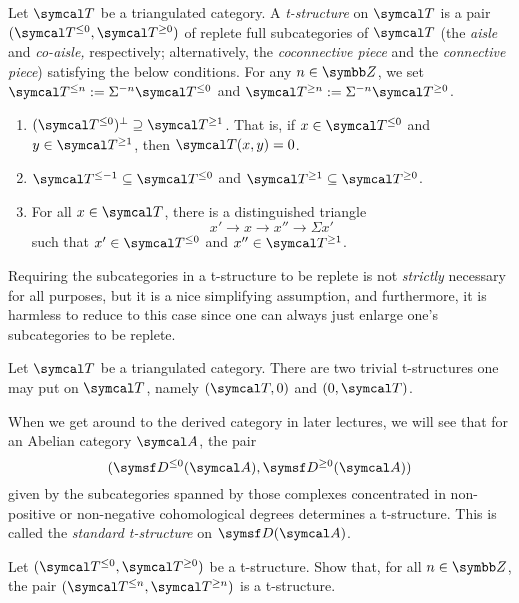 \begin{definition}
	Let \(\calT\) be a triangulated category. A \emph{t-structure} on \(\calT\) is a pair \((\calT^{\leq 0}, \calT^{\geq 0})\) of replete full subcategories of \(\calT\) (the \emph{aisle} and \emph{co-aisle,} respectively;
	alternatively, the \emph{coconnective piece} and the \emph{connective piece}) satisfying the below conditions. For any \(n\in\Z\), we set \(\calT^{\leq n} := \Sigma^{-n}\calT^{\leq 0}\) and \(\calT^{\geq n} := \Sigma^{-n}\calT^{\geq 0}\).
	\begin{enumerate}[label=(T\arabic*)]
		\item \((\calT^{\leq 0})^\perp \supseteq \calT^{\geq 1}\). That is, if \(x\in\calT^{\leq 0}\) and \(y\in\calT^{\geq 1}\), then \(\calT(x,y) = 0\).
		\item \(\calT^{\leq -1}\subseteq\calT^{\leq 0}\) and \(\calT^{\geq 1}\subseteq\calT^{\geq 0}\).
		\item For all \(x\in\calT\), there is a distinguished triangle
		\[ x' \to x \to x'' \to \Sigma x' \]
		such that \(x'\in\calT^{\leq 0}\) and \(x''\in\calT^{\geq 1}\).
	\end{enumerate}
\end{definition}
\begin{remark}
	Requiring the subcategories in a t-structure to be replete is not \emph{strictly} necessary for all purposes, but it is a nice simplifying assumption, and furthermore, it is harmless to reduce to this case
	since one can always just enlarge one's subcategories to be replete.
\end{remark}

\begin{example}
	Let \(\calT\) be a triangulated category. There are two trivial t-structures one may put on \(\calT\), namely \((\calT,0)\) and \((0,\calT)\).
\end{example}
\begin{example}
	When we get around to the derived category in later lectures, we will see that for an Abelian category \(\calA\), the pair
	\[ (\sfD^{\leq 0}(\calA),\sfD^{\geq 0}(\calA)) \]
	given by the subcategories spanned by those complexes concentrated in non-positive or non-negative cohomological degrees determines a t-structure. This is called the \emph{standard t-structure}
	on \(\sfD(\calA)\).
\end{example}
\begin{exercise}
	Let \((\calT^{\leq0},\calT^{\geq 0})\) be a t-structure. Show that, for all \(n\in\Z\), the pair \((\calT^{\leq n},\calT^{\geq n})\) is a t-structure.
\end{exercise}

